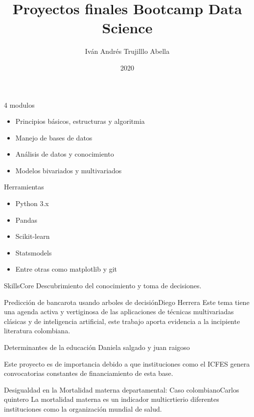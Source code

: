 \documentclass{beamer}
\institute{BIT}
\date{2020}
\title[BIT] %
{Proyectos finales Bootcamp Data Science}
\subtitle{}
\author[Iván Andrés Trujillo] 
{
Iván Andrés Trujilllo Abella}
\institute[] 
{
  BIT\\
  \and
  
\textbf{ivantrujillo129@gmail.com}
}
\date[BIT] %
\begin{document}
\frame{\titlepage}


\begin{frame}{4 modulos}
\begin{itemize}
\item Principios básicos, estructuras y algoritmia
\item Manejo de bases de datos
\item Análisis de datos y conocimiento 
\item Modelos bivariados y multivariados
\end{itemize}
\end{frame}

\begin{frame}{Herramientas}
\begin{itemize}
\item Python 3.x
\item Pandas
\item Scikit-learn
\item Statsmodels
\item Entre otras como matplotlib y git 
\end{itemize}
\end{frame}





\begin{frame}{Skills}{Core}
Descubrimiento del conocimiento y toma de decisiones.
\end{frame}


\begin{frame}{Predicción de bancarota usando arboles de decisión}{Diego Herrera}
Este tema tiene una agenda activa y vertiginosa de las aplicaciones de técnicas multivariadas clásicas y de inteligencia artificial,  este trabajo aporta evidencia a la incipiente literatura colombiana.
\end{frame}

\begin{frame}{Determinantes de la educación }{Daniela salgado y juan raigoso}

Este proyecto es de importancia debido a que instituciones como el ICFES genera convocatorias constantes de financiamiento de esta base.


\end{frame}


\begin{frame}{Desigualdad en la Mortalidad materna departamental: Caso colombiano}{Carlos quintero}
La mortalidad materna es un indicador multicrtierio diferentes instituciones como la organización mundial de salud.
\end{frame}
\end{document}
